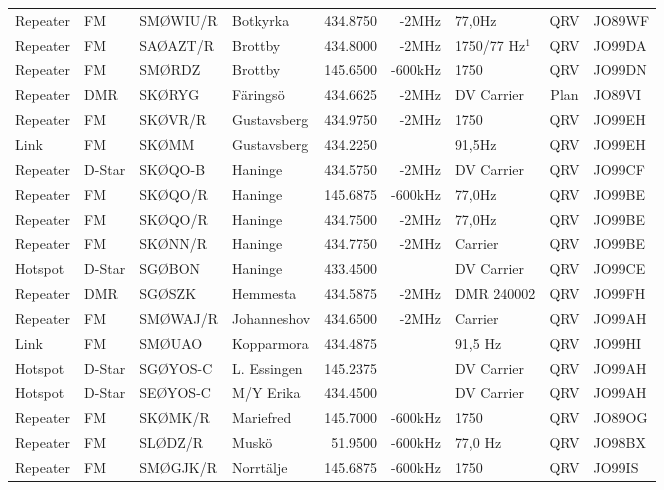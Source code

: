 \begin{landscape}
\begin{longtable}{llllrrlcl}
Repeater & FM     & SMØWIU/R & Botkyrka    & 434.8750  & -2MHz   & 77,0Hz         & QRV  & JO89WF \\
Repeater & FM     & SAØAZT/R & Brottby     & 434.8000  & -2MHz   & 1750/77 Hz$^1$ & QRV  & JO99DA \\
Repeater & FM     & SMØRDZ   & Brottby     & 145.6500  & -600kHz & 1750           & QRV  & JO99DN \\
Repeater & DMR    & SKØRYG   & Färingsö    & 434.6625  & -2MHz   & DV Carrier     & Plan & JO89VI \\
Repeater & FM     & SKØVR/R  & Gustavsberg & 434.9750  & -2MHz   & 1750           & QRV  & JO99EH \\
Link     & FM     & SKØMM    & Gustavsberg & 434.2250  &         & 91,5Hz         & QRV  & JO99EH \\
Repeater & D-Star & SKØQO-B  & Haninge     & 434.5750  & -2MHz   & DV Carrier     & QRV  & JO99CF \\
Repeater & FM     & SKØQO/R  & Haninge     & 145.6875  & -600kHz & 77,0Hz         & QRV  & JO99BE \\
Repeater & FM     & SKØQO/R  & Haninge     & 434.7500  & -2MHz   & 77,0Hz         & QRV  & JO99BE \\
Repeater & FM     & SKØNN/R  & Haninge     & 434.7750  & -2MHz   & Carrier        & QRV  & JO99BE \\
Hotspot  & D-Star & SGØBON   & Haninge     & 433.4500  &         & DV Carrier     & QRV  & JO99CE \\
Repeater & DMR    & SGØSZK   & Hemmesta    & 434.5875  & -2MHz   & DMR 240002     & QRV  & JO99FH \\
Repeater & FM     & SMØWAJ/R & Johanneshov & 434.6500  & -2MHz   & Carrier        & QRV  & JO99AH \\
Link     & FM     & SMØUAO   & Kopparmora  & 434.4875  &         & 91,5 Hz        & QRV  & JO99HI \\
Hotspot  & D-Star & SGØYOS-C & L. Essingen & 145.2375  &         & DV Carrier     & QRV  & JO99AH \\
Hotspot  & D-Star & SEØYOS-C & M/Y Erika   & 434.4500  &         & DV Carrier     & QRV  & JO99AH \\
Repeater & FM     & SKØMK/R  & Mariefred   & 145.7000  & -600kHz & 1750           & QRV  & JO89OG \\
Repeater & FM     & SLØDZ/R  & Muskö       & 51.9500   & -600kHz & 77,0 Hz        & QRV  & JO98BX \\
Repeater & FM     & SMØGJK/R & Norrtälje   & 145.6875  & -600kHz & 1750           & QRV  & JO99IS \\

\end{longtable}
\end{landscape}
